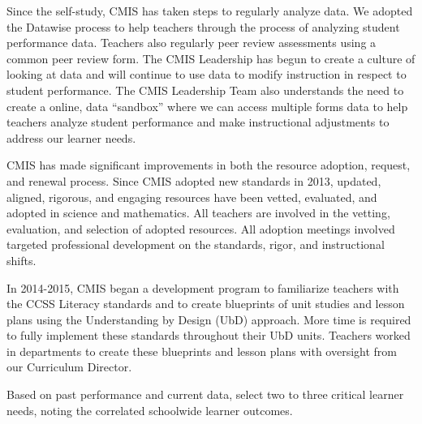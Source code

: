 Since the self-study, CMIS has taken steps to regularly analyze data. We adopted the Datawise process to help teachers through the process of analyzing student performance data. Teachers also regularly peer review assessments using a common peer review form. The CMIS Leadership has begun to create a culture of looking at data and will continue to use data to modify instruction in respect to student performance. The CMIS Leadership Team also understands the need to create a online, data “sandbox” where we can access multiple forms data to help teachers analyze student performance and make instructional adjustments to address our learner needs.

CMIS has made significant improvements in both the resource adoption, request, and renewal process. Since CMIS adopted new standards in 2013, updated, aligned, rigorous, and engaging resources have been vetted, evaluated, and adopted in science and mathematics. All teachers are involved in the vetting, evaluation, and selection of adopted resources. All adoption meetings involved targeted professional development on the standards, rigor, and instructional shifts. 

In 2014-2015, CMIS began a development program to familiarize teachers with the CCSS Literacy standards and to create blueprints of unit studies and lesson plans using the Understanding by Design (UbD) approach. More time is required to fully implement these standards throughout their UbD units. Teachers worked in departments to create these blueprints and lesson plans with oversight from our Curriculum Director.  


Based on past performance and current data, select two to three critical learner needs, noting the correlated schoolwide learner outcomes.

